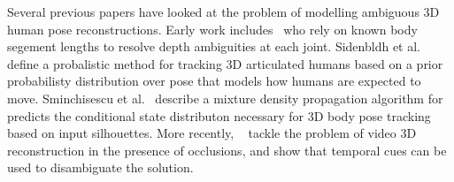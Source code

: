 


Several previous papers have looked at the problem of modelling ambiguous 3D human pose reconstructions. Early work includes~\cite{kinematic-jump-processes} who rely on known body segement lengths to resolve depth ambiguities at each joint. Sidenbldh et al.~\cite{tracking-3d-human-figures} define a probalistic method for tracking 3D articulated humans based on a prior probabilisty distribution over pose that models how humans are expected to move. Sminchisescu et al.~\cite{density-prop} describe a mixture density propagation algorithm for predicts the conditional state distributon necessary for 3D body pose tracking based on input silhouettes. More recently, ~\cite{cheng19occlusion-aware} tackle the problem of video 3D reconstruction in the presence of occlusions, and show that temporal cues can be used to disambiguate the solution. 



